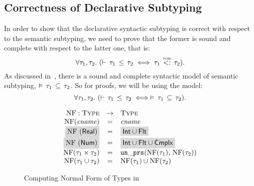 \subsection{Correctness of Declarative Subtyping}

In order to show that the declarative syntactic subtyping is correct
with respect to the semantic subtyping,
we need to prove that the former is sound and complete with respect
to the latter one, that is:
\[
\forall \ty_1, \ty_2.\ (\bjsub{\ty_1}{\ty_2} \iff \bjtruesemsub{\ty_1}{\ty_2}).
\]
As discussed in~, there is 
a sound and complete syntactic model of semantic subtyping,
$\vDash \, \tau_1 \, \subseteq \, \tau_2$.
So for proofs, we will be using the model:
\begin{equation}\label{eq:declsub-eq-semsub}
\forall \tau_1, \tau_2.\ (\vdash \, \tau_1 \, \leq \, \tau_2 \iff \vDash \, \tau_1 \, \subseteq \, \tau_2).
\end{equation}

\begin{figure}
  \[
	\begin{array}{rcl}
	\NF: \Type &\rightarrow& \Type \\
	\NF(\cname) &=& \cname \\
	\colorbox{light-gray}{\NF(\tyreal)} &=&
	\colorbox{light-gray}{\tyunion{\tyint}{\tyflt}} \\
	\colorbox{light-gray}{\NF(\tynum)} &=&
	\colorbox{light-gray}{\tyunion{\tyunion{\tyint}{\tyflt}}{\tycmplx}} \\
	\NF(\typair{\ty_1}{\ty_2}) &=& \unprs(\NF(\ty_1), \, \NF(\ty_2))	\\
	\NF(\tyunion{\ty_1}{\ty_2}) &=& \tyunion{\NF(\ty_1)}{\NF(\ty_2)} \\
	\end{array}
  \]
	\caption{Computing Normal Form of Types in \BetaJulia}
	\label{fig:bjsem-calc-nf}
\end{figure}
